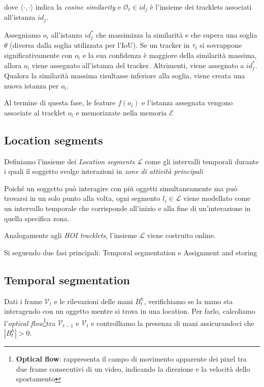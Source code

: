 dove $\langle \cdot, \cdot \rangle$ indica la \emph{cosine similarity} e $\mathcal{O}_t \in id_j$ è l'insieme dei tracklets associati all'istanza $id_j$.  

Assegniamo $o_i$ all'istanza $id_j^*$ che massimizza la similarità e che supera una soglia $\theta$ (diversa dalla soglia utilizzata per l'IoU). Se un tracker in $\tau_t$ si sovrappone significativamente con $o_i$ e la sua confidenza è maggiore della similarità massima, allora $o_i$ viene assegnato all'istanza del tracker. Altrimenti, viene assegnato a $id_j^*$. Qualora la similarità massima risultasse inferiore alla soglia, viene creata una nuova istanza per $o_i$.  

Al termine di questa fase, le feature $f(o_i)$ e l'istanza assegnata vengono associate al tracklet $o_i$ e memorizzate nella memoria $\mathcal{E}$

\subsection*{Location segments}
Definiamo l'insieme dei \emph{Location segments} $\mathcal{L}$ come gli intervalli temporali durante i quali il soggetto svolge interazioni in \emph{zone di attività principali}

Poiché un soggetto può interagire con più oggetti simultaneamente ma può trovarsi in un solo punto alla volta, ogni segmento $l_i \in \mathcal{L}$ viene modellato come un intervallo temporale che corrisponde all'inizio e alla fine di un'interazione in quella specifica zona.  

Analogamente agli \emph{HOI tracklets}, l'insieme $\mathcal{L}$ viene costruito online.

Si seguendo due fasi principali: Temporal segmentation e Assignment and storing

\subsection*{Temporal segmentation}
Dati i frame $\mathcal{V}_t$ e le rilevazioni delle mani $B_t^h$, verifichiamo se la mano sta interagendo con un oggetto mentre si trova in una location. Per farlo, calcoliamo l'\emph{optical flow}\footnote{\textbf{Optical flow}: rappresenta il campo di movimento apparente dei pixel tra due frame consecutivi di un video, indicando la direzione e la velocità dello spostamento}tra $\mathcal{V}_{t-1}$ e $\mathcal{V}_t$ e controlliamo la presenza di mani assicurandoci che $|B_t^h|>0$.

